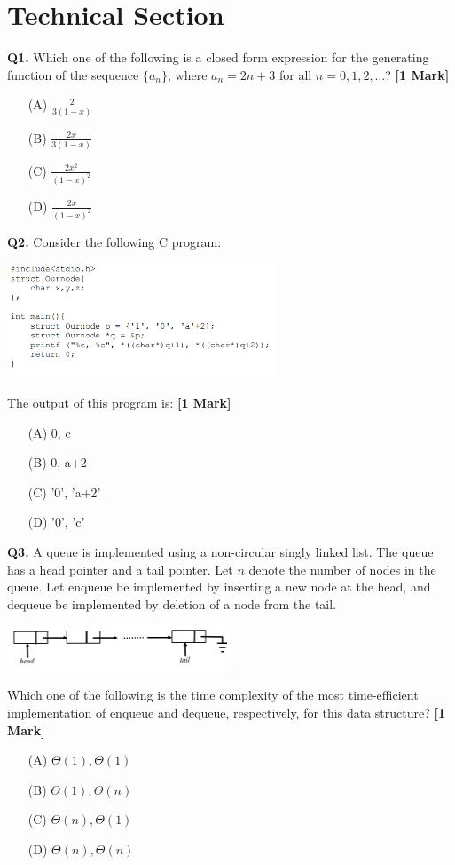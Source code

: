 \documentclass[11pt]{article}
\newcommand{\questiona}[2]{
    \noindent\textbf{Q#2.} #1 \hfill \textbf{[1 Mark]}
}
\begin{document}
\section*{Technical Section}

\questiona{Which one of the following is a closed form expression for the generating function of the sequence \( \{a_n\} \), where \( a_n = 2n + 3 \) for all \( n = 0, 1, 2, \dots \)?}{1}
\begin{enumerate}
    \item[(A)] \( \frac{2}{3(1 - x)} \)
    \item[(B)] \( \frac{2x}{3(1 - x)} \)
    \item[(C)] \( \frac{2x^2}{(1 - x)^2} \)
    \item[(D)] \( \frac{2x}{(1 - x)^2} \)
\end{enumerate}
\vspace{0.5cm}

\questiona{Consider the following C program:
\begin{center}
\includegraphics[width=0.6\textwidth]{figures/2.png}
\end{center}
The output of this program is:}{2}
\begin{enumerate}
    \item[(A)] 0, c
    \item[(B)] 0, a+2
    \item[(C)] '0', 'a+2'
    \item[(D)] '0', 'c'
\end{enumerate}
\vspace{0.5cm}

\questiona{A queue is implemented using a non-circular singly linked list. The queue has a head pointer and a tail pointer. Let \( n \) denote the number of nodes in the queue. Let enqueue be implemented by inserting a new node at the head, and dequeue be implemented by deletion of a node from the tail.
\begin{center}
\includegraphics[width=0.5\textwidth]{figures/3.png}
\end{center}
Which one of the following is the time complexity of the most time-efficient implementation of enqueue and dequeue, respectively, for this data structure?}{3}
\begin{enumerate}
    \item[(A)] \( \Theta(1), \Theta(1) \)
    \item[(B)] \( \Theta(1), \Theta(n) \)
    \item[(C)] \( \Theta(n), \Theta(1) \)
    \item[(D)] \( \Theta(n), \Theta(n) \)
\end{enumerate}
\vspace{0.5cm}
\end{document}
